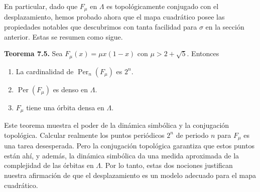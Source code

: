 \documentclass[10pt,a4paper]{book}
\begin{document}
En particular, dado que $F_\mu$ en $\Lambda$ es topológicamente conjugado con el desplazamiento, hemos probado ahora que el mapa cuadrático posee las propiedades notables que descubrimos con tanta facilidad para $\sigma$ en la sección anterior. Estas se resumen como sigue.

\textbf{Teorema 7.5.} Sea $F_\mu(x) = \mu x(1 - x)$ con $\mu > 2 + \sqrt{5}$. Entonces
\begin{enumerate}
    \item La cardinalidad de $\operatorname{Per}_n(F_\mu)$ es $2^n$.
    \item $\operatorname{Per}(F_\mu)$ es denso en $\Lambda$.
    \item $F_\mu$ tiene una órbita densa en $\Lambda$.
\end{enumerate}

Este teorema muestra el poder de la dinámica simbólica y la conjugación topológica. Calcular realmente los puntos periódicos $2^n$ de periodo $n$ para $F_\mu$ es una tarea desesperada. Pero la conjugación topológica garantiza que estos puntos están ahí, y además, la dinámica simbólica da una medida aproximada de la complejidad de las órbitas en $\Lambda$. Por lo tanto, estas dos nociones justifican nuestra afirmación de que el desplazamiento es un modelo adecuado para el mapa cuadrático.

\newpage
\end{document}
